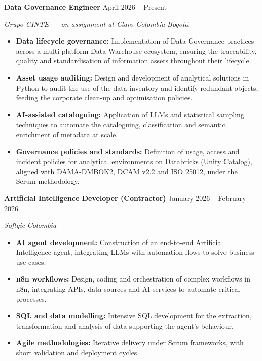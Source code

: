 \documentclass[letterpaper,10pt]{article}
\newcommand{\sizeTitle}  {\fontsize{10.6}{12.7}\selectfont}
\newcommand{\sizeContact}{\fontsize{9}{11}\selectfont}
\newcommand{\sizeWhere}  {\fontsize{9.5}{11.4}\selectfont}
\newcommand{\md}{\,\textperiodcentered\,}                  %
\newcommand{\cvrole}[2]{%
  \needspace{3\baselineskip}%
  {\color{cvdark}\sizeTitle\bfseries #1}%
  \hfill{\color{cvgray}\sizeContact #2}\par
  \vspace{1pt}%
}
\newcommand{\cvwhere}[1]{%
  {\color{cvgray}\sizeWhere\itshape #1}\par
  \vspace{3pt}%
}
\begin{document}
\cvrole{Data Governance Engineer}{April 2026 -- Present}
\cvwhere{Grupo CINTE --- on assignment at Claro Colombia\md Bogotá}
\begin{itemize}
  \item \textbf{Data lifecycle governance:} Implementation of Data Governance
        practices across a multi-platform Data Warehouse ecosystem, ensuring the
        traceability, quality and standardisation of information assets
        throughout their lifecycle.
  \item \textbf{Asset usage auditing:} Design and development of analytical
        solutions in Python to audit the use of the data inventory and identify
        redundant objects, feeding the corporate clean-up and optimisation
        policies.
  \item \textbf{AI-assisted cataloguing:} Application of LLMs and statistical
        sampling techniques to automate the cataloguing, classification and
        semantic enrichment of metadata at scale.
  \item \textbf{Governance policies and standards:} Definition of usage, access
        and incident policies for analytical environments on Databricks (Unity
        Catalog), aligned with DAMA-DMBOK2, DCAM v2.2 and ISO 25012, under the
        Scrum methodology.
\end{itemize}
\vspace{7pt}

\cvrole{Artificial Intelligence Developer (Contractor)}{January 2026 -- February 2026}
\cvwhere{Softgic\md Colombia}
\begin{itemize}
  \item \textbf{AI agent development:} Construction of an end-to-end Artificial
        Intelligence agent, integrating LLMs with automation flows to solve
        business use cases.
  \item \textbf{n8n workflows:} Design, coding and orchestration of complex
        workflows in n8n, integrating APIs, data sources and AI services to
        automate critical processes.
  \item \textbf{SQL and data modelling:} Intensive SQL development for the
        extraction, transformation and analysis of data supporting the agent's
        behaviour.
  \item \textbf{Agile methodologies:} Iterative delivery under Scrum frameworks,
        with short validation and deployment cycles.
\end{itemize}
\vspace{7pt}
\end{document}

